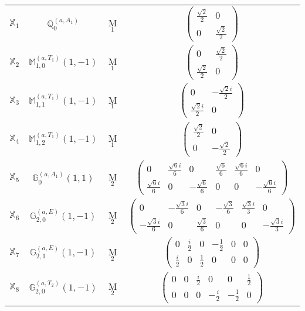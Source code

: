 \documentclass[fleqn,10pt,landscape]{article}
\begin{document}
\begin{itemize}
\begin{center}
\begin{longtable}{c|c|c|c}
$ \mathbb{X}_{1} $ & $\mathbb{Q}_{0}^{(a,A_{1})}$ & M$_{1}$ & $\begin{pmatrix} \frac{\sqrt{2}}{2} & 0 \\ 0 & \frac{\sqrt{2}}{2} \end{pmatrix}$ \\
$ \mathbb{X}_{2} $ & $\mathbb{M}_{1,0}^{(a,T_{1})}(1,-1)$ & M$_{1}$ & $\begin{pmatrix} 0 & \frac{\sqrt{2}}{2} \\ \frac{\sqrt{2}}{2} & 0 \end{pmatrix}$ \\
$ \mathbb{X}_{3} $ & $\mathbb{M}_{1,1}^{(a,T_{1})}(1,-1)$ & M$_{1}$ & $\begin{pmatrix} 0 & - \frac{\sqrt{2} i}{2} \\ \frac{\sqrt{2} i}{2} & 0 \end{pmatrix}$ \\
$ \mathbb{X}_{4} $ & $\mathbb{M}_{1,2}^{(a,T_{1})}(1,-1)$ & M$_{1}$ & $\begin{pmatrix} \frac{\sqrt{2}}{2} & 0 \\ 0 & - \frac{\sqrt{2}}{2} \end{pmatrix}$ \\ \hline
$ \mathbb{X}_{5} $ & $\mathbb{G}_{0}^{(a,A_{1})}(1,1)$ & M$_{2}$ & $\begin{pmatrix} 0 & \frac{\sqrt{6} i}{6} & 0 & \frac{\sqrt{6}}{6} & \frac{\sqrt{6} i}{6} & 0 \\ \frac{\sqrt{6} i}{6} & 0 & - \frac{\sqrt{6}}{6} & 0 & 0 & - \frac{\sqrt{6} i}{6} \end{pmatrix}$ \\
$ \mathbb{X}_{6} $ & $\mathbb{G}_{2,0}^{(a,E)}(1,-1)$ & M$_{2}$ & $\begin{pmatrix} 0 & - \frac{\sqrt{3} i}{6} & 0 & - \frac{\sqrt{3}}{6} & \frac{\sqrt{3} i}{3} & 0 \\ - \frac{\sqrt{3} i}{6} & 0 & \frac{\sqrt{3}}{6} & 0 & 0 & - \frac{\sqrt{3} i}{3} \end{pmatrix}$ \\
$ \mathbb{X}_{7} $ & $\mathbb{G}_{2,1}^{(a,E)}(1,-1)$ & M$_{2}$ & $\begin{pmatrix} 0 & \frac{i}{2} & 0 & - \frac{1}{2} & 0 & 0 \\ \frac{i}{2} & 0 & \frac{1}{2} & 0 & 0 & 0 \end{pmatrix}$ \\
$ \mathbb{X}_{8} $ & $\mathbb{G}_{2,0}^{(a,T_{2})}(1,-1)$ & M$_{2}$ & $\begin{pmatrix} 0 & 0 & \frac{i}{2} & 0 & 0 & \frac{1}{2} \\ 0 & 0 & 0 & - \frac{i}{2} & - \frac{1}{2} & 0 \end{pmatrix}$ \\

\end{longtable}
\end{center}
\end{itemize}
\end{document}
